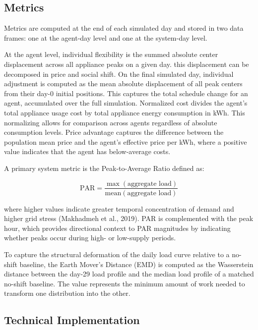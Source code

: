 \documentclass[11pt, a4paper]{article}
\begin{document}
\subsection{Metrics} \label{subs:metrics}

Metrics are computed at the end of each simulated day and stored in two data frames: one at the agent-day level and one at the system-day level.
 
At the agent level, individual flexibility is the summed absolute center displacement across all appliance peaks on a given day. this displacement can be decomposed in price and social shift. On the final simulated day, individual adjustment is computed as the mean absolute displacement of all peak centers from their day-0 initial positions. This captures the total schedule change for an agent, accumulated over the full simulation. Normalized cost divides the agent's total appliance usage cost by total appliance energy consumption in kWh. This normalizing allows for comparison across agents regardless of absolute consumption levels. Price advantage captures the difference between the population mean price and the agent's effective price per kWh, where a positive value indicates that the agent has below-average costs.

A primary system metric is the Peak-to-Average Ratio defined as:
 
\begin{equation}
\mathrm{PAR} = \frac{\max(\text{aggregate load})}{\text{mean}(\text{aggregate load})}
\label{eq:par}
\end{equation}
 
where higher values indicate greater temporal concentration of demand and higher grid stress (Makhadmeh et al., 2019). PAR is complemented with the peak hour, which provides directional context to PAR magnitudes by indicating whether peaks occur during high- or low-supply periods.
 
To capture the structural deformation of the daily load curve relative to a no-shift baseline, the Earth Mover's Distance (EMD) is computed as the Wasserstein distance between the day-29 load profile and the median load profile of a matched no-shift baseline. The value represents the minimum amount of work needed to transform one distribution into the other.

\subsection{Technical Implementation} \label{subs:technical}
\end{document}
